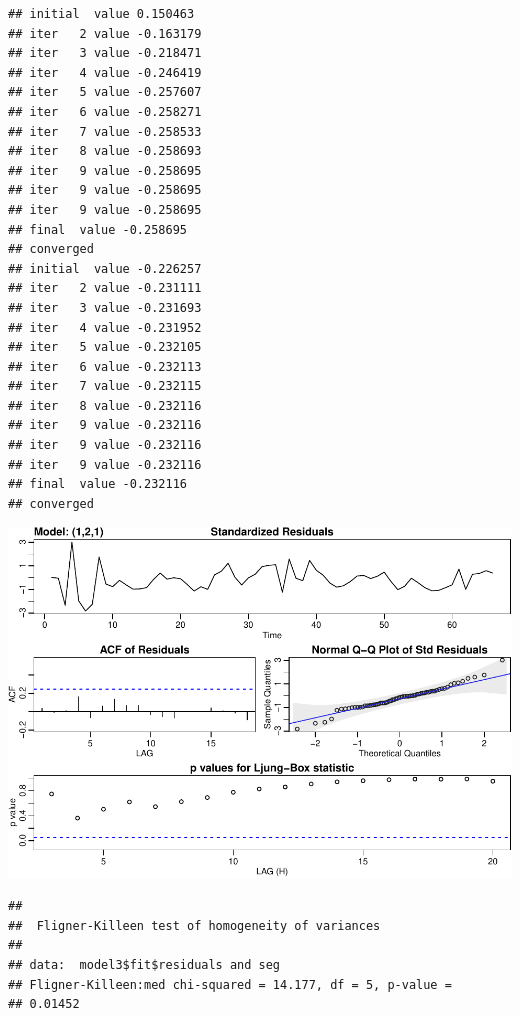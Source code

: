 \documentclass[]{article}
\newenvironment{Shaded}{\begin{snugshade}}{\end{snugshade}}
\newcommand{\DataTypeTok}[1]{\textcolor[rgb]{0.13,0.29,0.53}{#1}}
\newcommand{\DecValTok}[1]{\textcolor[rgb]{0.00,0.00,0.81}{#1}}
\newcommand{\KeywordTok}[1]{\textcolor[rgb]{0.13,0.29,0.53}{\textbf{#1}}}
\newcommand{\NormalTok}[1]{#1}
\newcommand{\OperatorTok}[1]{\textcolor[rgb]{0.81,0.36,0.00}{\textbf{#1}}}
\newcommand{\StringTok}[1]{\textcolor[rgb]{0.31,0.60,0.02}{#1}}
\begin{document}
\begin{verbatim}
## initial  value 0.150463 
## iter   2 value -0.163179
## iter   3 value -0.218471
## iter   4 value -0.246419
## iter   5 value -0.257607
## iter   6 value -0.258271
## iter   7 value -0.258533
## iter   8 value -0.258693
## iter   9 value -0.258695
## iter   9 value -0.258695
## iter   9 value -0.258695
## final  value -0.258695 
## converged
## initial  value -0.226257 
## iter   2 value -0.231111
## iter   3 value -0.231693
## iter   4 value -0.231952
## iter   5 value -0.232105
## iter   6 value -0.232113
## iter   7 value -0.232115
## iter   8 value -0.232116
## iter   9 value -0.232116
## iter   9 value -0.232116
## iter   9 value -0.232116
## final  value -0.232116 
## converged
\end{verbatim}

\begin{center}\includegraphics{Q5_files/figure-latex/unnamed-chunk-12-1} \end{center}

\begin{Shaded}
\end{Shaded}

\begin{verbatim}
## 
##  Fligner-Killeen test of homogeneity of variances
## 
## data:  model3$fit$residuals and seg
## Fligner-Killeen:med chi-squared = 14.177, df = 5, p-value =
## 0.01452
\end{verbatim}
\end{document}
